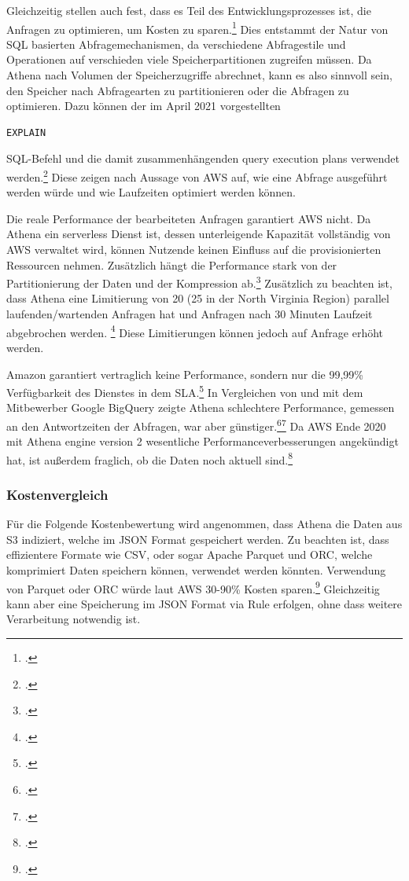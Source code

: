 Gleichzeitig stellen \citeauthor{Hartland.2018} auch fest, dass es Teil des Entwicklungsprozesses ist, die Anfragen zu  optimieren, um Kosten zu sparen.\footcite[Vgl.][5]{Hartland.2018} Dies entstammt der Natur von \ac{SQL} basierten Abfragemechanismen, da verschiedene Abfragestile und Operationen auf verschieden viele Speicherpartitionen zugreifen müssen. Da Athena nach Volumen der Speicherzugriffe abrechnet, kann es also sinnvoll sein, den Speicher nach Abfragearten zu partitionieren oder die Abfragen zu optimieren. Dazu können der im April 2021 vorgestellten \begin{verbatim}EXPLAIN\end{verbatim} \ac{SQL}-Befehl und die damit zusammenhängenden query execution plans verwendet werden.\footcite[Vgl. auch im Folgenden][]{AmazonWebServicesInc..2021} Diese zeigen nach Aussage von \ac{AWS} auf, wie eine Abfrage ausgeführt werden würde und wie Laufzeiten optimiert werden können.

Die reale Performance der bearbeiteten Anfragen garantiert \ac{AWS} nicht. Da Athena ein serverless Dienst ist, dessen unterleigende Kapazität vollständig von \ac{AWS} verwaltet wird, können Nutzende keinen Einfluss auf die provisionierten Ressourcen nehmen. Zusätzlich hängt die Performance stark von der Partitionierung der Daten und der Kompression ab.\footcite[Vgl.][]{Levy.2021} Zusätzlich zu beachten ist, dass Athena eine Limitierung von 20 (25 in der North Virginia Region) parallel laufenden/wartenden Anfragen hat und Anfragen nach 30 Minuten Laufzeit abgebrochen werden. \footcite[Vgl. auch im Folgenden][]{AmazonWebServicesInc..o.J.ac} Diese Limitierungen können jedoch auf Anfrage erhöht werden.

Amazon garantiert vertraglich keine Performance, sondern nur die 99,99\% Verfügbarkeit des Dienstes in dem \ac{SLA}.\footcite[Vgl.][]{AmazonWebServicesInc..2019c} In Vergleichen von \citeauthor{Levy.2019} und \citeauthor{Khadtare.2018} mit dem Mitbewerber Google BigQuery zeigte Athena schlechtere Performance, gemessen an den Antwortzeiten der Abfragen, war aber günstiger.\footcite[Vgl.][]{Levy.2019}\nzitat\footcite[Vgl.][]{Khadtare.2018} Da \ac{AWS} Ende 2020 mit Athena engine version 2 wesentliche Performanceverbesserungen angekündigt hat, ist außerdem fraglich, ob die Daten noch aktuell sind.\footcite[Vgl.][]{AmazonWebServicesInc..2020c}

\subsubsection{Kostenvergleich}
Für die Folgende Kostenbewertung wird angenommen, dass Athena die Daten aus \ac{S3} indiziert, welche im \ac{JSON} Format gespeichert werden. Zu beachten ist, dass effizientere Formate wie CSV, oder sogar Apache Parquet und ORC, welche komprimiert Daten speichern können, verwendet werden  könnten. Verwendung von Parquet oder ORC würde laut \ac{AWS} 30-90\% Kosten sparen.\footcite[Vgl.][]{AmazonWebServicesInc..o.J.t} Gleichzeitig kann aber eine Speicherung im \ac{JSON} Format via \AWSIOT{} Rule erfolgen, ohne dass weitere Verarbeitung notwendig ist.


